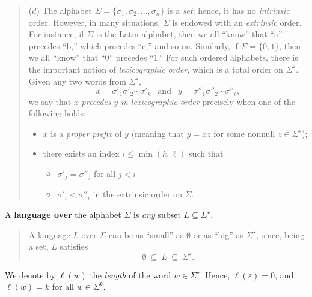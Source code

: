 \documentclass{article}
\begin{document}
{\begin{quote}
($d$)
The alphabet $\Sigma = \{\sigma_1, \sigma_2, \ldots, \sigma_n\}$ is a
{\em set}; hence, it has no {\em intrinsic} order.  However, in many
situations, $\Sigma$ is endowed with an {\em extrinsic} order.  For
instance, if $\Sigma$ is the Latin alphabet, then we all ``know'' that
``a'' precedes ``b,'' which precedes ``c,'' and so on.  Similarly, if
$\Sigma = \{0,1\}$, then we all ``know'' that ``$0$'' precedes ``$1$.''
For such ordered alphabets, there is the important notion of {\em
lexicographic order,}
which is a total order on $\Sigma^\star$.  Given any two words from
$\Sigma^\star$,
\[ x = \sigma'_1 \sigma'_2 \cdots \sigma'_k \ \ \mbox{ and } \ \
y = \sigma''_1 \sigma''_2 \cdots \sigma''_\ell,
\]
we say that $x$ {\em precedes} $y$ {\em in lexicographic order}
precisely when one of the following holds:
\begin{itemize}
\item
$x$ is a {\em proper prefix}
of $y$ (meaning that $y = xz$ for some nonnull $z \in \Sigma^\star$);
\item
there exists an index $i \leq \min(k, \ell)$ such that
  \begin{itemize}
  \item
$\sigma'_j = \sigma''_j$ for all $j < i$
  \item
$\sigma'_i < \sigma''_i$ in the extrinsic order on $\Sigma$.
  \end{itemize}
\end{itemize}
\end{quote}
A {\bf language
over} the alphabet $\Sigma$ is {\em any} subset $L \subseteq
\Sigma^\star$.
\begin{quote}
A language $L$ over $\Sigma$ can be as ``small'' as $\emptyset$ or as
``big'' as $\Sigma^\star$, since, being a set, $L$ satisfies
\[ \emptyset \ \subseteq \ L \ \subseteq \ \Sigma^\star. \]
\end{quote}
We denote by $\ell(w)$
the {\em length}\index{length of word $w$ ($\ell(w)$)}
of the word $w \in \Sigma^\star$.  Hence, $\ell(\varepsilon) = 0$, and
$\ell(w) = k$ for all $w \in \Sigma^k$.

}
\end{document}
